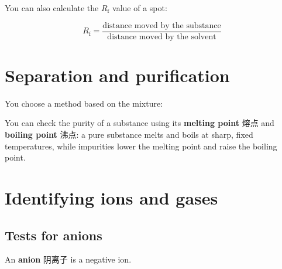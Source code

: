 \documentclass[11pt]{article}
\begin{document}
You can also calculate the $R_{\text{f}}$ value of a spot:

\[
R_{\text{f}} = \frac{\text{distance moved by the substance}}{\text{distance moved by the solvent}}
\]

\section*{Separation and purification}

You choose a method based on the mixture:

\begin{center}
\end{center}

You can check the purity of a substance using its \textbf{melting point} 熔点 and \textbf{boiling point} 沸点: a pure substance melts and boils at sharp, fixed temperatures, while impurities lower the melting point and raise the boiling point.

\section*{Identifying ions and gases}

\subsection*{Tests for anions}

An \textbf{anion} 阴离子 is a negative ion.
\end{document}

